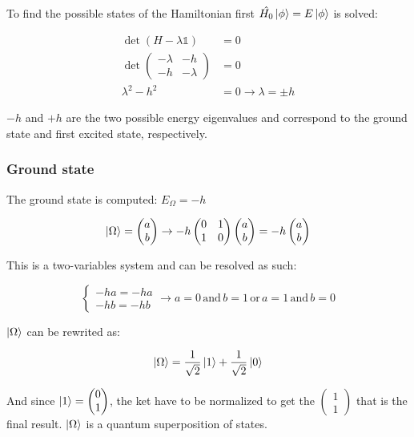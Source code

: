 	To find the possible states of the Hamiltonian first $\hat{H_0}\ket{\phi}=E\ket{\phi}$ is solved:

	\begin{align*}
		\det(H-\lambda \mathbb{1})&=0\\
		\det\begin{pmatrix}-\lambda&-h\\-h&-\lambda\end{pmatrix}&=0\\
		\lambda^2-h^2&=0 \rightarrow \lambda=\pm h
	\end{align*}

	$-h$ and $+h$ are the two possible energy eigenvalues and correspond to the ground state and first excited state, respectively.

		\subsubsection{Ground state}
		The ground state is computed: $E_\Omega=-h$

		$$\ket{\Omega}=\begin{pmatrix}a\\b\end{pmatrix}\rightarrow-h\begin{pmatrix}0&1\\1&0\end{pmatrix}\begin{pmatrix}a\\b\end{pmatrix}=-h\begin{pmatrix}a\\b\end{pmatrix}$$

		This is a two-variables system and can be resolved as such:

		$$\begin{cases}-ha=-ha\\-hb=-hb\end{cases}\rightarrow a=0\, \text{and}\, b=1\, \text{or}\, a=1\, \text{and}\, b=0$$

		$\ket{\Omega}$ can be rewrited as:

		$$\ket{\Omega}=\frac{1}{\sqrt{2}}\ket{1}+\frac{1}{\sqrt{2}}\ket{0}$$

		And since $\ket{1}=\begin{pmatrix}0\\1\end{pmatrix}$, the ket have to be normalized to get the $\begin{pmatrix}1\\1\end{pmatrix}$ that is the final result.
		$\ket{\Omega}$ is a quantum superposition of states.

